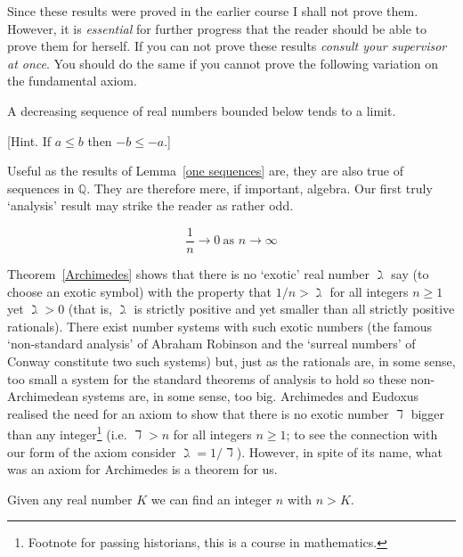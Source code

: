 Since these results were proved in the earlier course I shall
not prove them. However, it is \emph{essential} for
further progress that the reader should be able to prove
them for herself. If you can not prove these results
\emph{consult your supervisor at once}. You should do the
same if you cannot prove the following variation
on the fundamental axiom.
\begin{lemma}\label{Exercise 1.4} 
A decreasing sequence of real numbers bounded below tends
to a limit.
\end{lemma}
[Hint. If $a\leq b$ then $-b\leq -a$.]


Useful as the results of Lemma~\ref{one sequences} are,
they are also true of sequences in ${\mathbb Q}$.
They are therefore mere, if important, algebra.
Our first truly `analysis' result may strike the
reader as rather odd.
\begin{theorem}\label{Archimedes}
\[\frac{1}{n}\rightarrow 0\ \text{as $n\rightarrow\infty$}\]
\end{theorem}
Theorem~\ref{Archimedes} shows that there is no `exotic'
real number $\gimel$ say (to choose an exotic symbol)
with the property that $1/n>\gimel$ for all integers $n\geq 1$
yet $\gimel>0$ (that is, $\gimel$ is strictly positive
and yet smaller than all strictly positive rationals). 
There exist number systems with such exotic numbers
(the famous `non-standard analysis' of Abraham Robinson
and the `surreal numbers' of Conway constitute two
such systems) but, just as the rationals are, in
some sense, too
small a system for the standard theorems of analysis to hold
so these non-Archimedean systems are, in some sense,
too big. Archimedes and  Eudoxus
realised the need for an axiom
to show that there is no exotic number $\daleth$ bigger
than any integer\footnote{Footnote for passing historians,
this is a course in mathematics.}
(i.e. $\daleth>n$ for all integers $n\geq 1$;
to see the connection with our form of the axiom consider
$\gimel=1/\daleth$). However, in spite of its name, what
was an axiom for Archimedes is a theorem
for us. 
\begin{theorem} Given any real number $K$ we can find
an integer $n$ with $n>K$.
\end{theorem}
